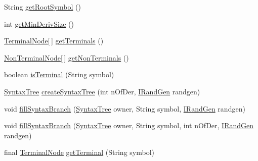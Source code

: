 \begin{DoxyCompactItemize}
\item 
String \hyperlink{classnet_1_1sf_1_1jclec_1_1syntaxtree_1_1_syntax_tree_schema_a1ea9913889c71cf0eee9475e6acca09b}{get\-Root\-Symbol} ()
\item 
int \hyperlink{classnet_1_1sf_1_1jclec_1_1syntaxtree_1_1_syntax_tree_schema_adf8d34b11cf858fefd181e40bb818515}{get\-Min\-Deriv\-Size} ()
\item 
\hyperlink{classnet_1_1sf_1_1jclec_1_1syntaxtree_1_1_terminal_node}{Terminal\-Node}\mbox{[}$\,$\mbox{]} \hyperlink{classnet_1_1sf_1_1jclec_1_1syntaxtree_1_1_syntax_tree_schema_a6415e8fd79d035f608c40af87e408379}{get\-Terminals} ()
\item 
\hyperlink{classnet_1_1sf_1_1jclec_1_1syntaxtree_1_1_non_terminal_node}{Non\-Terminal\-Node}\mbox{[}$\,$\mbox{]} \hyperlink{classnet_1_1sf_1_1jclec_1_1syntaxtree_1_1_syntax_tree_schema_a04185fbde34c1ae5060752c7abaeb657}{get\-Non\-Terminals} ()
\item 
boolean \hyperlink{classnet_1_1sf_1_1jclec_1_1syntaxtree_1_1_syntax_tree_schema_ab9fccdd1e34811e4c561390faff341d0}{is\-Terminal} (String symbol)
\item 
\hyperlink{classnet_1_1sf_1_1jclec_1_1syntaxtree_1_1_syntax_tree}{Syntax\-Tree} \hyperlink{classnet_1_1sf_1_1jclec_1_1syntaxtree_1_1_syntax_tree_schema_a12d9ea12a41fb9e1b785dadc319b3246}{create\-Syntax\-Tree} (int n\-Of\-Der, \hyperlink{interfacenet_1_1sf_1_1jclec_1_1util_1_1random_1_1_i_rand_gen}{I\-Rand\-Gen} randgen)
\item 
void \hyperlink{classnet_1_1sf_1_1jclec_1_1syntaxtree_1_1_syntax_tree_schema_afd8e929ecbdf111e77cd013b5e706bf8}{fill\-Syntax\-Branch} (\hyperlink{classnet_1_1sf_1_1jclec_1_1syntaxtree_1_1_syntax_tree}{Syntax\-Tree} owner, String symbol, \hyperlink{interfacenet_1_1sf_1_1jclec_1_1util_1_1random_1_1_i_rand_gen}{I\-Rand\-Gen} randgen)
\item 
void \hyperlink{classnet_1_1sf_1_1jclec_1_1syntaxtree_1_1_syntax_tree_schema_a18420a49092db89c58dec29bfbeec7bd}{fill\-Syntax\-Branch} (\hyperlink{classnet_1_1sf_1_1jclec_1_1syntaxtree_1_1_syntax_tree}{Syntax\-Tree} owner, String symbol, int n\-Of\-Der, \hyperlink{interfacenet_1_1sf_1_1jclec_1_1util_1_1random_1_1_i_rand_gen}{I\-Rand\-Gen} randgen)
\item 
final \hyperlink{classnet_1_1sf_1_1jclec_1_1syntaxtree_1_1_terminal_node}{Terminal\-Node} \hyperlink{classnet_1_1sf_1_1jclec_1_1syntaxtree_1_1_syntax_tree_schema_aaff3207028b6e36f2b63933f51b19860}{get\-Terminal} (String symbol)
\end{DoxyCompactItemize}
